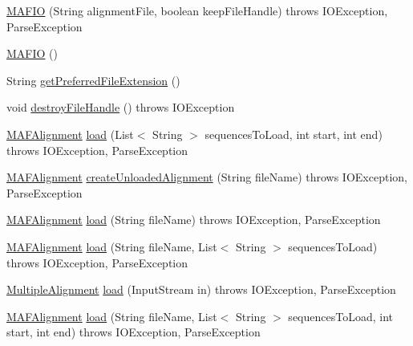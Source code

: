 \begin{DoxyCompactItemize}
\item 
\hyperlink{classbroad_1_1core_1_1multiplealignment_1_1_m_a_f_i_o_a5faaf6458bab8337b93511919f83724f}{M\+A\+F\+I\+O} (String alignment\+File, boolean keep\+File\+Handle)  throws I\+O\+Exception, Parse\+Exception 
\item 
\hyperlink{classbroad_1_1core_1_1multiplealignment_1_1_m_a_f_i_o_a9a7da14eda446c38526151cabe664e8c}{M\+A\+F\+I\+O} ()
\item 
String \hyperlink{classbroad_1_1core_1_1multiplealignment_1_1_m_a_f_i_o_ae65f18d5f17bfc130ce07c8bc4f001d0}{get\+Preferred\+File\+Extension} ()
\item 
void \hyperlink{classbroad_1_1core_1_1multiplealignment_1_1_m_a_f_i_o_aa3b07da2223c8f5c586944a36d2685de}{destroy\+File\+Handle} ()  throws I\+O\+Exception 
\item 
\hyperlink{classbroad_1_1core_1_1multiplealignment_1_1_m_a_f_alignment}{M\+A\+F\+Alignment} \hyperlink{classbroad_1_1core_1_1multiplealignment_1_1_m_a_f_i_o_ac7c1cdf0013e039c7e531fc18b074389}{load} (List$<$ String $>$ sequences\+To\+Load, int start, int end)  throws I\+O\+Exception, Parse\+Exception 
\item 
\hyperlink{classbroad_1_1core_1_1multiplealignment_1_1_m_a_f_alignment}{M\+A\+F\+Alignment} \hyperlink{classbroad_1_1core_1_1multiplealignment_1_1_m_a_f_i_o_a454109fd269c309a9a313abf27bed8b6}{create\+Unloaded\+Alignment} (String file\+Name)  throws I\+O\+Exception, Parse\+Exception 
\item 
\hyperlink{classbroad_1_1core_1_1multiplealignment_1_1_m_a_f_alignment}{M\+A\+F\+Alignment} \hyperlink{classbroad_1_1core_1_1multiplealignment_1_1_m_a_f_i_o_a10f2572ad2a0facfa998c9d0107c106b}{load} (String file\+Name)  throws I\+O\+Exception, Parse\+Exception 
\item 
\hyperlink{classbroad_1_1core_1_1multiplealignment_1_1_m_a_f_alignment}{M\+A\+F\+Alignment} \hyperlink{classbroad_1_1core_1_1multiplealignment_1_1_m_a_f_i_o_af337e802f2c75b9cfc95643b148c2e1e}{load} (String file\+Name, List$<$ String $>$ sequences\+To\+Load)  throws I\+O\+Exception, Parse\+Exception 
\item 
\hyperlink{classbroad_1_1core_1_1multiplealignment_1_1_multiple_alignment}{Multiple\+Alignment} \hyperlink{classbroad_1_1core_1_1multiplealignment_1_1_m_a_f_i_o_ad44015f88e196cbebeb646ee11d8000c}{load} (Input\+Stream in)  throws I\+O\+Exception, Parse\+Exception 
\item 
\hyperlink{classbroad_1_1core_1_1multiplealignment_1_1_m_a_f_alignment}{M\+A\+F\+Alignment} \hyperlink{classbroad_1_1core_1_1multiplealignment_1_1_m_a_f_i_o_a9d74d443c3d0f45b0d81468f5447e0fb}{load} (String file\+Name, List$<$ String $>$ sequences\+To\+Load, int start, int end)  throws I\+O\+Exception, Parse\+Exception 

\end{DoxyCompactItemize}
